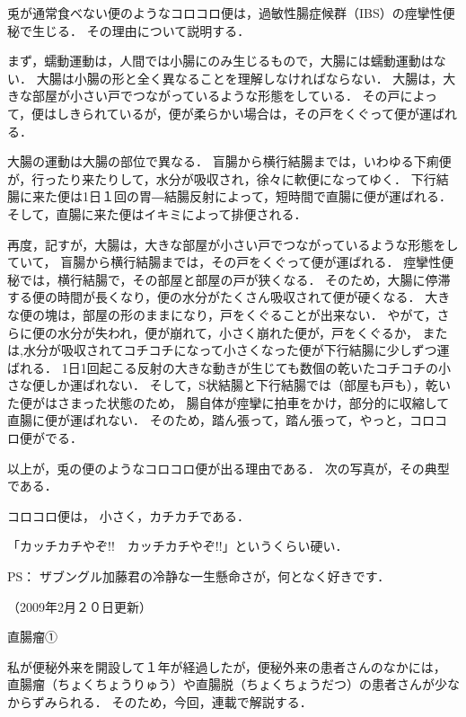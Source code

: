 兎が通常食べない便のようなコロコロ便は，過敏性腸症候群（IBS）の痙攣性便秘で生じる．
その理由について説明する．

まず，蠕動運動は，人間では小腸にのみ生じるもので，大腸には蠕動運動はない．
大腸は小腸の形と全く異なることを理解しなければならない．
大腸は，大きな部屋が小さい戸でつながっているような形態をしている．
その戸によって，便はしきられているが，便が柔らかい場合は，その戸をくぐって便が運ばれる．




大腸の運動は大腸の部位で異なる．
盲腸から横行結腸までは，いわゆる下痢便が，行ったり来たりして，水分が吸収され，徐々に軟便になってゆく．
下行結腸に来た便は1日１回の胃―結腸反射によって，短時間で直腸に便が運ばれる．
そして，直腸に来た便はイキミによって排便される．




再度，記すが，大腸は，大きな部屋が小さい戸でつながっているような形態をしていて， 
盲腸から横行結腸までは，その戸をくぐって便が運ばれる．
痙攣性便秘では，横行結腸で，その部屋と部屋の戸が狭くなる．
そのため，大腸に停滞する便の時間が長くなり，便の水分がたくさん吸収されて便が硬くなる．
大きな便の塊は，部屋の形のままになり，戸をくぐることが出来ない．
やがて，さらに便の水分が失われ，便が崩れて，小さく崩れた便が，戸をくぐるか，
または,水分が吸収されてコチコチになって小さくなった便が下行結腸に少しずつ運ばれる．
1日1回起こる反射の大きな動きが生じても数個の乾いたコチコチの小さな便しか運ばれない．
そして，S状結腸と下行結腸では（部屋も戸も），乾いた便がはさまった状態のため，
腸自体が痙攣に拍車をかけ，部分的に収縮して直腸に便が運ばれない．
そのため，踏ん張って，踏ん張って，やっと，コロコロ便がでる．





以上が，兎の便のようなコロコロ便が出る理由である．
次の写真が，その典型である．




コロコロ便は，
小さく，カチカチである．

「カッチカチやぞ!!　カッチカチやぞ!!」というくらい硬い．


PS：
ザブングル加藤君の冷静な一生懸命さが，何となく好きです．

（2009年2月２０日更新）






直腸瘤①

私が便秘外来を開設して１年が経過したが，便秘外来の患者さんのなかには，
直腸瘤（ちょくちょうりゅう）や直腸脱（ちょくちょうだつ）の患者さんが少なからずみられる． 
そのため，今回，連載で解説する．

